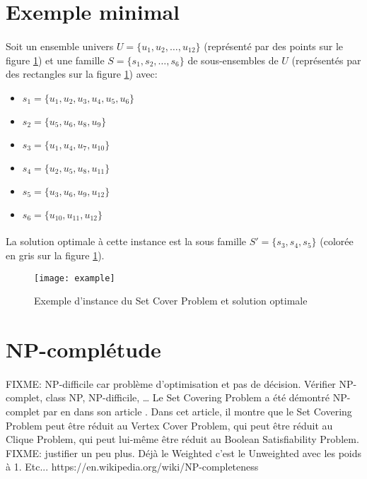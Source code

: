 \documentclass[12pt,letterpaper,twoside]{article}
\begin{document}
	\section{Exemple minimal}
		\paragraph*{}
			Soit un ensemble univers \(U = \{u_1, u_2, \dots, u_{12}\}\) (représenté par des points sur le figure \ref{fig:example}) et une famille \(S = \{s_1, s_2, \dots, s_6\}\) de sous-ensembles de \(U\) (représentés par des rectangles sur la figure \ref{fig:example}) avec:
			\begin{itemize}
				\item \(s_1 = \{u_1, u_2, u_3, u_4, u_5, u_6\}\)
				\item \(s_2 = \{u_5, u_6, u_8, u_9\}\)
				\item \(s_3 = \{u_1, u_4, u_7, u_{10}\}\)
				\item \(s_4 = \{u_2, u_5, u_8, u_{11}\}\)
				\item \(s_5 = \{u_3, u_6, u_9, u_{12}\}\)
				\item \(s_6 = \{u_{10}, u_{11}, u_{12}\}\)
			\end{itemize}
		\paragraph*{}
			La solution optimale à cette instance est la sous famille \(S'=\{s_3, s_4, s_5\}\) (colorée en gris sur la figure \ref{fig:example}).
		\begin{figure}[H]
			\centering%
			\texttt{[image: example]}%
			\caption{Exemple d'instance du Set Cover Problem et solution optimale\cite{Mount2017}}%
			\label{fig:example}%
		\end{figure}
	\section{NP-complétude}
		\paragraph*{}
			FIXME: NP-difficile car problème d'optimisation et pas de décision. Vérifier NP-complet, class NP, NP-difficile, …
			Le Set Covering Problem a été démontré NP-complet par \citeauthor{Karp1972} en \citeyear{Karp1972} dans son article \cite{Karp1972}. Dans cet article, il montre que le Set Covering Problem peut être réduit au Vertex Cover Problem, qui peut être réduit au Clique Problem, qui peut lui-même être réduit au Boolean Satisfiability Problem.
			FIXME: justifier un peu plus. Déjà le Weighted c'est le Unweighted avec les poids à 1. Etc...
			https://en.wikipedia.org/wiki/NP-completeness
\end{document}
